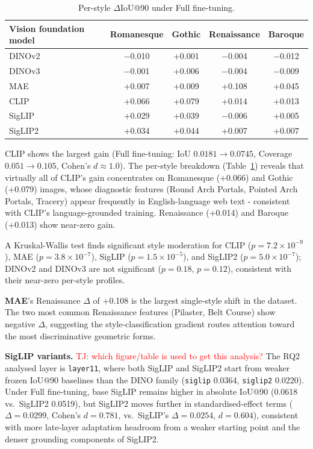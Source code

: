 \documentclass[lineno,pdflatex,sn-mathphys-num]{sn-jnl}%
\theoremstyle{thmstyleone}%
\theoremstyle{thmstyletwo}%
\theoremstyle{thmstylethree}%
\begin{document}
\begin{table}[!h]
\centering
\caption{Per-style $\Delta$IoU@90 under Full fine-tuning.}
\label{table RQ3 perstyle}
\begin{tabular}{lcccc}
\toprule
Vision foundation model & Romanesque & Gothic & Renaissance & Baroque \\ \midrule
DINOv2  & $-$0.010 & +0.001 & $-$0.004 & $-$0.012 \\
DINOv3  & $-$0.001 & +0.006 & $-$0.004 & $-$0.009 \\
MAE     & +0.007 & +0.009 & +0.108 & +0.045 \\
CLIP    & +0.066 & +0.079 & +0.014 & +0.013 \\
SigLIP  & +0.029 & +0.039 & $-$0.006 & +0.005 \\
SigLIP2 & +0.034 & +0.044 & +0.007 & +0.007 \\
\bottomrule
\end{tabular}
\end{table}


CLIP shows the largest gain (Full fine-tuning: IoU $0.0181\!\to\!0.0745$, Coverage $0.051\!\to\!0.105$, Cohen's $d\!\approx\!1.0$). The per-style breakdown (Table~\ref{table RQ3 perstyle}) reveals that virtually all of CLIP's gain concentrates on Romanesque (+0.066) and Gothic (+0.079) images, whose diagnostic features (Round Arch Portals, Pointed Arch Portals, Tracery) appear frequently in English-language web text - consistent with CLIP's language-grounded training. Renaissance (+0.014) and Baroque (+0.013) show near-zero gain.

A Kruskal-Wallis test finds significant style moderation for CLIP ($p\!=\!7.2\!\times\!10^{-9}$), MAE ($p\!=\!3.8\!\times\!10^{-7}$), SigLIP ($p\!=\!1.5\!\times\!10^{-5}$), and SigLIP2 ($p\!=\!5.0\!\times\!10^{-7}$); DINOv2 and DINOv3 are not significant ($p\!=\!0.18$, $p\!=\!0.12$), consistent with their near-zero per-style profiles.

\textbf{MAE}'s Renaissance $\Delta$ of +0.108 is the largest single-style shift in the dataset. The two most common Renaissance features (Pilaster, Belt Course) show negative $\Delta$, suggesting the style-classification gradient routes attention toward the most discriminative geometric forms.

\textbf{SigLIP variants.} \textcolor{red}{TJ: which figure/table is used to get this analysis?} The RQ2 analysed layer is \texttt{layer11}, where both SigLIP and SigLIP2 start from weaker frozen IoU@90 baselines than the DINO family (\texttt{siglip} 0.0364, \texttt{siglip2} 0.0220). Under Full fine-tuning, base SigLIP remains higher in absolute IoU@90 (0.0618 vs.\ SigLIP2 0.0519), but SigLIP2
moves further in standardised-effect terms ($\Delta\!=\!0.0299$, Cohen's $d\!=\!0.781$, vs.\ SigLIP's $\Delta\!=\!0.0254$, $d\!=\!0.604$), consistent with more late-layer adaptation headroom from a weaker starting point and the denser grounding components of SigLIP2.
\end{document}
